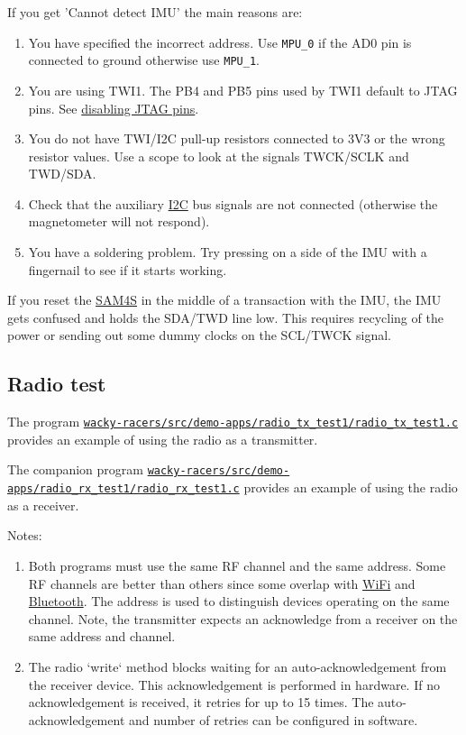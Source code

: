 If you get 'Cannot detect IMU' the main reasons are:

\begin{enumerate}
\item
  You have specified the incorrect address. Use \texttt{MPU\_0} if the
  AD0 pin is connected to ground otherwise use \texttt{MPU\_1}.
\item
  You are using TWI1. The PB4 and PB5 pins used by TWI1 default to JTAG
  pins. See \protect\hyperref[disabling-jtag-pins]{disabling JTAG pins}.
\item
  You do not have TWI/I2C pull-up resistors connected to 3V3 or the
  wrong resistor values. Use a scope to look at the signals TWCK/SCLK
  and TWD/SDA.
\item
  Check that the auxiliary \url{I2C} bus signals are not connected
  (otherwise the magnetometer will not respond).  
\item
  You have a soldering problem. Try pressing on a side of the IMU with a
  fingernail to see if it starts working.
\end{enumerate}

If you reset the \url{SAM4S} in the middle of a transaction with the
IMU, the IMU gets confused and holds the SDA/TWD line low. This requires
recycling of the power or sending out some dummy clocks on the SCL/TWCK
signal.


\subsection{Radio test}
\label{radio-test}

The program
\href{https://eng-git.canterbury.ac.nz/mph/wacky-racers-2021/blob/master/src/demo-apps/radio_tx_test1/radio_tx_test1.c}{\texttt{wacky-racers/src/demo-apps/radio\_tx\_test1/radio\_tx\_test1.c}}
provides an example of using the radio as a transmitter.

The companion program
\href{https://eng-git.canterbury.ac.nz/mph/wacky-racers-2021/blob/master/src/demo-apps/radio_rx_test1/radio_rx_test1.c}{\texttt{wacky-racers/src/demo-apps/radio\_rx\_test1/radio\_rx\_test1.c}}
provides an example of using the radio as a receiver.

Notes:
%
\begin{enumerate}
\item
  Both programs must use the same RF channel and the same address. Some
  RF channels are better than others since some overlap with \url{WiFi}
  and \url{Bluetooth}. The address is used to distinguish devices
  operating on the same channel. Note, the transmitter expects an
  acknowledge from a receiver on the same address and channel.
\item
  The radio `write` method blocks waiting for an auto-acknowledgement
  from the receiver device. This acknowledgement is performed in
  hardware. If no acknowledgement is received, it retries for up to 15
  times. The auto-acknowledgement and number of retries can be
  configured in software.
\end{enumerate}

